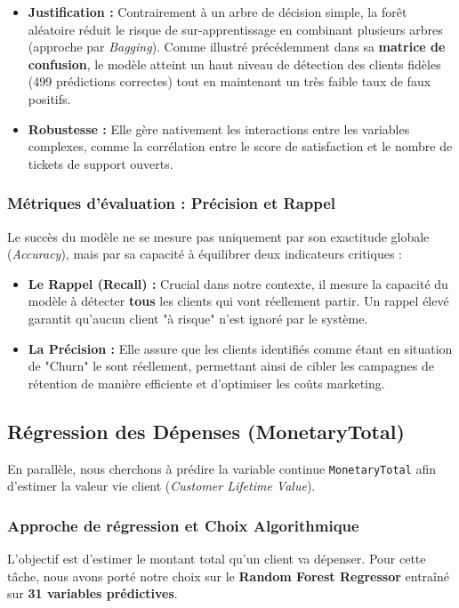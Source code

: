 \documentclass[11pt,a4paper]{article}
\begin{document}
\begin{itemize}
    \item \textbf{Justification :} Contrairement à un arbre de décision simple, la forêt aléatoire réduit le risque de sur-apprentissage en combinant plusieurs arbres (approche par \textit{Bagging}). Comme illustré précédemment dans sa \textbf{matrice de confusion}, le modèle atteint un haut niveau de détection des clients fidèles (499 prédictions correctes) tout en maintenant un très faible taux de faux positifs.
    \item \textbf{Robustesse :} Elle gère nativement les interactions entre les variables complexes, comme la corrélation entre le score de satisfaction et le nombre de tickets de support ouverts.
\end{itemize}

\subsubsection{Métriques d'évaluation : Précision et Rappel}
Le succès du modèle ne se mesure pas uniquement par son exactitude globale (\textit{Accuracy}), mais par sa capacité à équilibrer deux indicateurs critiques :
\begin{itemize}
    \item \textbf{Le Rappel (Recall) :} Crucial dans notre contexte, il mesure la capacité du modèle à détecter \textbf{tous} les clients qui vont réellement partir. Un rappel élevé garantit qu'aucun client "à risque" n'est ignoré par le système.
    \item \textbf{La Précision :} Elle assure que les clients identifiés comme étant en situation de "Churn" le sont réellement, permettant ainsi de cibler les campagnes de rétention de manière efficiente et d'optimiser les coûts marketing.
\end{itemize}


\subsection{Régression des Dépenses (MonetaryTotal)}
En parallèle, nous cherchons à prédire la variable continue \texttt{MonetaryTotal} afin d'estimer la valeur vie client (\textit{Customer Lifetime Value}).

\subsubsection{Approche de régression et Choix Algorithmique}
L'objectif est d'estimer le montant total qu'un client va dépenser. Pour cette tâche, nous avons porté notre choix sur le \textbf{Random Forest Regressor} entraîné sur \textbf{31 variables prédictives}.
\end{document}
